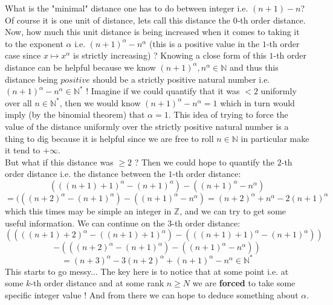 \begin{solution}
    What is the "minimal" distance one has to do between integer i.e. \( \left(n+1\right)-n \)? Of course it is one unit of distance, lets call this distance the \( 0 \)-th order distance. Now, how much this unit distance is being increased when it comes to taking it to the exponent \( \alpha \) i.e. \( \left(n+1\right)^{\alpha}-n^{\alpha} \) (this is a positive value in the \( 1 \)-th order case since \( x\mapsto x^{\alpha} \) is strictly increasing) ? Knowing a close form of this \( 1 \)-th order distance can be helpful because we know \( \left(n+1\right)^{\alpha},n^{\alpha}\in\mathbb{N} \) and thus this distance being \( positive \) should be a strictly positive natural number i.e. \( \left(n+1\right)^{\alpha}-n^{\alpha}\in\mathbb{N}^{*} \) ! Imagine if we could quantify that it was \( <2 \) uniformly over all \( n\in\mathbb{N}^{*} \), then we would know \( \left(n+1\right)^{\alpha}-n^{\alpha}=1 \) which in turn would imply (by the binomial theorem) that \( \alpha=1 \). This idea of trying to force the value of the distance uniformly over the strictly positive natural number is a thing to dig because it is helpful since we are free to roll \( n\in\mathbb{N} \) in particular make it tend to \( +\infty \). \\
    But what if this distance was \( \geq 2 \) ? Then we could hope to quantify the \( 2 \)-th order distance i.e. the distance between the \( 1 \)-th order distance:
    \[
        \left(\left(\left(n+1\right)+1\right)^{\alpha}-\left(n+1\right)^{\alpha}\right)-\left(\left(n+1\right)^{\alpha}-n^{\alpha}\right)
    \]
    \[
        =(\left(\left(n+2\right)^{\alpha}-\left(n+1\right)^{\alpha}\right)-\left(\left(n+1\right)^{\alpha}-n^{\alpha}\right)=\left(n+2\right)^{\alpha}+n^{\alpha}-2\left(n+1\right)^{\alpha}
    \]
    which this times may be simple an integer in \( \mathbb{Z} \), and we can try to get some useful information. We can continue on the \( 3 \)-th order distance:
    \[
        \left(\left(\left(\left(n+1\right)+2\right)^{\alpha}-\left(\left(n+1\right)+1\right)^{\alpha}\right)-\left(\left(\left(n+1\right)+1\right)^{\alpha}-\left(n+1\right)^{\alpha}\right)\right)
    \]
    \[
        -\left(\left(\left(n+2\right)^{\alpha}-\left(n+1\right)^{\alpha}\right)-\left(\left(n+1\right)^{\alpha}-n^{\alpha}\right)\right)
    \]
    \[
        =\left(n+3\right)^{\alpha}-3\left(n+2\right)^{\alpha}+\left(n+1\right)^{\alpha}-n^{\alpha}\in\mathbb{N}^{*}
    \]
    This starts to go messy... The key here is to notice that at some point i.e. at some \( k \)-th order distance and at some rank \( n\geq N \) we are \textbf{forced} to take some specific integer value ! And from there we can hope to deduce something about \( \alpha \).

\end{solution}
